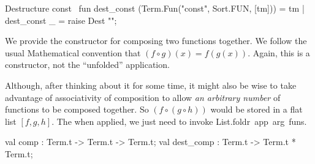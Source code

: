 \LA{}Destructure \code{}const\edoc{}~{\nwtagstyle{}}\RA{}
\eatline
{}\nwendcode{}\nwdocspar
\nwenddocs{}\endmoddef\nwstartdeflinemarkup{}\nwenddeflinemarkup
fun dest_const (Term.Fun("const", Sort.FUN, [tm])) = tm
  | dest_const _ = raise Dest "";
\eatline
{}\nwendcode{}\nwdocspar
\begin{node}
We provide the constructor for composing two functions together. We
follow the usual Mathematical convention that $(f\circ g)(x)=f(g(x))$.
Again, this is a constructor, not the ``unfolded'' application.

Although, after thinking about it for some time, it might also be wise
to take advantage of associativity of composition to allow \emph{an
arbitrary number} of functions to be composed together. So
$(f\circ(g\circ h))$ would be stored in a flat list $[f,g,h]$. The
when applied, we just need to invoke {\Tt{}List.foldr\ app\ arg\ funs\nwendquote}.
\end{node}
\nwenddocs{}\plusendmoddef\nwstartdeflinemarkup{}\nwenddeflinemarkup
val comp : Term.t -> Term.t -> Term.t;
val dest_comp : Term.t -> Term.t * Term.t;
\nwendcode{}\nwdocspar

